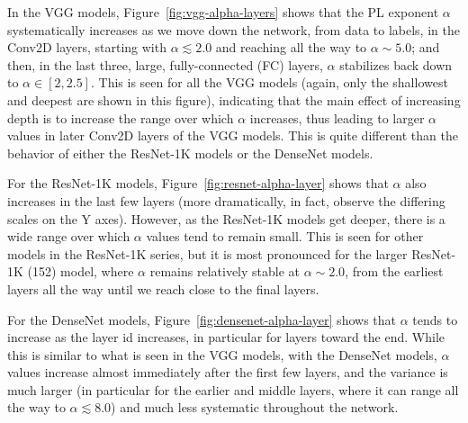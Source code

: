 In the VGG models, Figure~\ref{fig:vgg-alpha-layers} shows that the PL exponent $\alpha$ systematically increases as we move down the network, from data to labels, in the Conv2D layers, starting with $\alpha\lesssim 2.0$ and reaching all the way to $\alpha\sim 5.0$; and then, in the last three, large, fully-connected (FC) layers, $\alpha$ stabilizes back down to $\alpha\in[2,2.5]$.
This is seen for all the VGG models (again, only the shallowest and deepest are shown in this figure), indicating that the main effect of increasing depth is to increase the range over which $\alpha$ increases, thus leading to larger $\alpha$ values in later Conv2D layers of the VGG models.
This is quite different than the behavior of either the ResNet-1K models or the DenseNet models.

For the ResNet-1K models, Figure~\ref{fig:resnet-alpha-layer} shows that $\alpha$ also increases in the last few layers (more dramatically, in fact, observe the differing scales on the Y axes).
However, as the ResNet-1K models get deeper, there is a wide range over which $\alpha$ values tend to remain small.
This is seen for other models in the ResNet-1K series, but it is most pronounced for the larger ResNet-1K (152) model, where $\alpha$ remains relatively stable at $\alpha\sim 2.0$, from the earliest layers all the way until we reach close to the final layers.  

For the DenseNet models, Figure~\ref{fig:densenet-alpha-layer} shows that $\alpha$ tends to increase as the layer id increases, in particular for layers toward the end.
While this is similar to what is seen in the VGG models, with the DenseNet models, $\alpha$ values increase almost immediately after the first few layers, and the variance is much larger (in particular for the earlier and middle layers, where it can range all the way to $\alpha\lesssim 8.0$) and much less systematic throughout the network.

